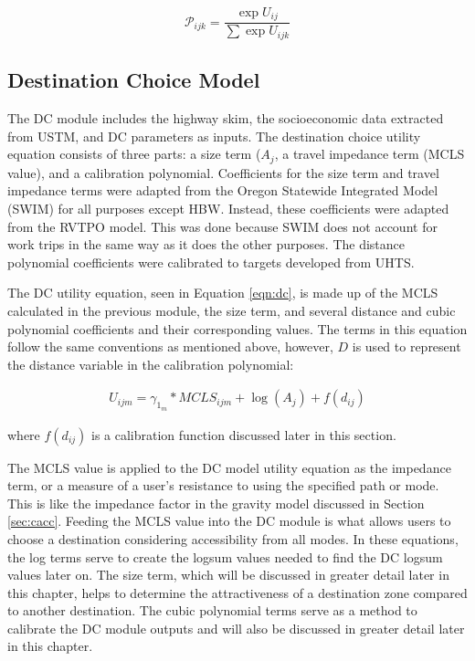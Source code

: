 \begin{equation}
	\mathcal{P}_{ijk} = \frac{\exp U_{ij}}{\sum \exp U_{ijk}}
	\label{eqn:prob}
\end{equation}

\subsection{Destination Choice Model}
\label{sec:dc}
The DC module
includes the highway skim, the socioeconomic data extracted
from USTM, and DC parameters as inputs.
The destination choice utility equation consists of three parts: a size term (\(A_j\),
a travel impedance term (MCLS value), and a calibration polynomial. Coefficients for the
size term and travel impedance terms were adapted from the Oregon
Statewide Integrated Model (SWIM) for all purposes except HBW. Instead, these coefficients were
adapted from the RVTPO model. This was done because SWIM does not account for work trips in the same way as it does the other purposes. The distance polynomial coefficients were
calibrated to targets developed from UHTS.

The DC utility equation, seen in Equation \ref{eqn:dc}, is made up of the
MCLS calculated in the previous module, the size term, and several distance and cubic polynomial
coefficients and their corresponding values. The terms in this equation follow the same conventions as mentioned
above, however, \(D\) is used to represent the distance variable in the calibration polynomial:

\begin{equation}
\begin{aligned}
	U_{ijm} = \gamma_{1_{m}} * MCLS_{ijm} + \log (A_{j}) + f(d_{ij})
\label{eqn:dc}
\end{aligned}
\end{equation}

\noindent where $f(d_{ij})$ is a calibration function discussed later in this section.

The MCLS value is applied to the DC model utility equation as the impedance
term, or a measure of
a user’s resistance to using the specified path or mode. This is like the
impedance factor in the
gravity model discussed in Section \ref{sec:cacc}. Feeding the MCLS value into
the DC module is what allows
users to choose a destination considering accessibility from all modes. In these
equations, the log terms serve to create the logsum values needed to find
the DC logsum values later on.
The size term, which
will be discussed in greater detail later in this chapter, helps to determine
the attractiveness
of a destination zone compared to another destination. The cubic polynomial
terms serve as a
method to calibrate the DC module outputs and will also be discussed in
greater detail later in
this chapter.

